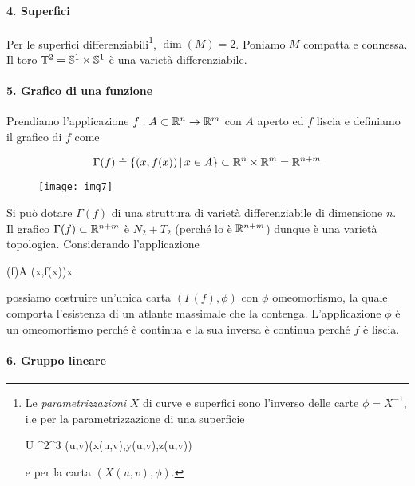 \paragraph{4. Superfici}

Per le superfici differenziabili\footnote{%
	Le \textit{parametrizzazioni} $ X $ di curve e superfici sono l'inverso delle carte $ \phi = X^{-1} $, i.e per la parametrizzazione di una superficie
	
		{U \subset \R^{2}}{\R^{3}}%
		{(u,v)}{(x(u,v),y(u,v),z(u,v))}

	e per la carta $ (X(u,v),\phi) $.%
}, $ \dim (M) = 2 $. Poniamo $ M $ compatta e connessa.\\
Il toro $ \mathbb{T}^{2} = \mathbb{S}^{1} \times \mathbb{S}^{1} $ è una varietà differenziabile.

\paragraph{5. Grafico di una funzione}

Prendiamo l'applicazione $ f : A \subset \mathbb{R}^{n} \to \mathbb{R}^{m} $ con $ A $ aperto ed $ f $ liscia e definiamo il grafico di $ f $ come

\begin{equation}
	\Gamma(f) \doteq \left\{ (x,f(x)) \, \middle| \, x \in A \right\} \subset \mathbb{R}^{n} \times \mathbb{R}^{m} = \mathbb{R}^{n+m}
\end{equation}

\begin{figure}[H]
	\centering
	\texttt{[image: img7]}
\end{figure}

Si può dotare $ \Gamma(f) $ di una struttura di varietà differenziabile di dimensione $ n $.\\
Il grafico $ \Gamma(f) \subset \mathbb{R}^{n+m} $ è $ N_{2}+T_{2} $ (perché lo è $ \mathbb{R}^{n+m} $) dunque è una varietà topologica. Considerando l'applicazione

\map{\phi}%
	{\Gamma(f)}{A}%
	{(x,f(x))}{x}

possiamo costruire un'unica carta $ (\Gamma(f),\phi) $ con $ \phi $ omeomorfismo, la quale comporta l'esistenza di un atlante massimale che la contenga. L'applicazione $ \phi $ è un omeomorfismo perché è continua e la sua inversa è continua perché $ f $ è liscia.

\paragraph{6. Gruppo lineare}

